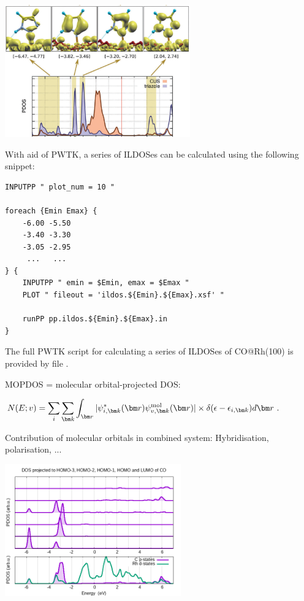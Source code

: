\documentclass[landscape]{foils}
\begin{document}
\begin{center}
  \includegraphics[width=0.6\textwidth]{figs/ildos.png}
\end{center}

With aid of PWTK, a series of ILDOSes can be calculated using the following snippet:
{
  \codecolor\small
\begin{verbatim}
INPUTPP " plot_num = 10 "

foreach {Emin Emax} {
    -6.00 -5.50
    -3.40 -3.30
    -3.05 -2.95
     ...   ...
} {
    INPUTPP " emin = $Emin, emax = $Emax "
    PLOT " fileout = 'ildos.${Emin}.${Emax}.xsf' "

    runPP pp.ildos.${Emin}.${Emax}.in
}
\end{verbatim}
}

The full PWTK script for calculating a series of ILDOSes of
CO@Rh(100) is provided by file .


MOPDOS = molecular orbital-projected DOS:\\[-0.5em]
\begin{center}
{\black
$\displaystyle
N(E;v)
 = \sum_i\sum_{\vk}
  \int_{\vr} |\psi_{i,\vk}^*(\vr)\psi_{v,\vk}^{\mathrm{mol}}(\vr)| \times
  \delta(\epsilon-\epsilon_{i,\vk}) d\vr\ .$
}
\end{center}

Contribution of molecular orbitals in combined system: Hybridisation,
polarisation, ...
\begin{center}
  \includegraphics[width=0.57\textwidth]{figs/moproj-CO-Rh100.png}
\end{center}
\end{document}
